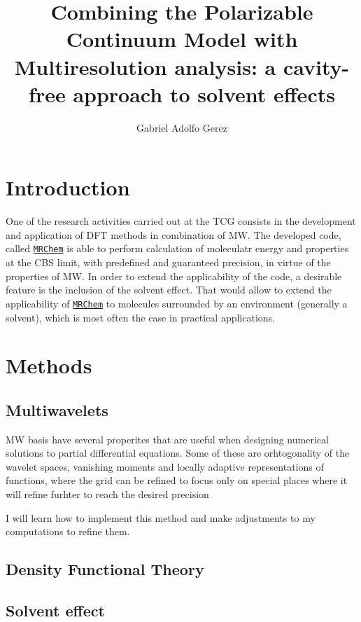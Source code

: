 \documentclass[a4paper,11pt]{article}
\title{Combining the Polarizable Continuum Model with Multiresolution
  analysis: a cavity-free approach to solvent effects}
\author{Gabriel Adolfo Gerez}
\newcommand{\mrchem}{\href{https://mrchem.readthedocs.io/en/latest/}{\texttt{MRChem}}}
\begin{document}
\maketitle

\section{Introduction}

One of the research activities carried out at the \ac{TCG} consists in
the development and application of \ac{DFT} methods in combination of
\ac{MW}. The developed code, called \mrchem{} is able to perform calculation of
moleculatr energy and properties at the \ac{CBS} limit, with
predefined and guaranteed precision, in virtue of the properties of
\ac{MW}. In order to extend the applicability of the code, a desirable
feature is the inclusion of the solvent effect. That would allow to
extend the applicability of \mrchem{} to molecules surrounded by an
environment (generally a solvent), which is most often the case in
practical applications.

\section{Methods}

\subsection{Multiwavelets}

\ac{MW} basis have several properites that are useful when designing numerical solutions to partial differential equations. Some of these are orhtogonality of the wavelet spaces, vanishing moments
and locally adaptive representations of functions, where the grid can be refined to focus only on special places where it will refine furhter to reach the desired precision %

I will learn how to implement this method and make adjustments to my computations to refine them.

\subsection{Density Functional Theory}

\subsection{Solvent effect}
\end{document}
